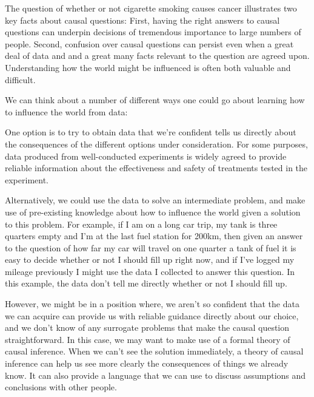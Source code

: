 The question of whether or not cigarette smoking causes cancer illustrates two key facts about causal questions: First, having the right answers to causal questions can underpin decisions of tremendous importance to large numbers of people. Second, confusion over causal questions can persist even when a great deal of data and and a great many facts relevant to the question are agreed upon. Understanding how the world might be influenced is often both valuable and difficult.

We can think about a number of different ways one could go about learning how to influence the world from data:

One option is to try to obtain data that we're confident tells us directly about the consequences of the different options under consideration. For some purposes, data produced from well-conducted experiments is widely agreed to provide reliable information about the effectiveness and safety of treatments tested in the experiment. 

Alternatively, we could use the data to solve an intermediate problem, and make use of pre-existing knowledge about how to influence the world given a solution to this problem. For example, if I am on a long car trip, my tank is three quarters empty and I'm at the last fuel station for 200km, then given an answer to the question of how far my car will travel on one quarter a tank of fuel it is easy to decide whether or not I should fill up right now, and if I've logged my mileage previously I might use the data I collected to answer this question. In this example, the data don't tell me directly whether or not I should fill up. 

However, we might be in a position where, we aren't so confident that the data we can acquire can provide us with reliable guidance directly about our choice, and we don't know of any surrogate problems that make the causal question straightforward. In this case, we may want to make use of a formal theory of causal inference. When we can't see the solution immediately, a theory of causal inference can help us see more clearly the consequences of things we already know. It can also provide a language that we can use to discuss assumptions and conclusions with other people.

